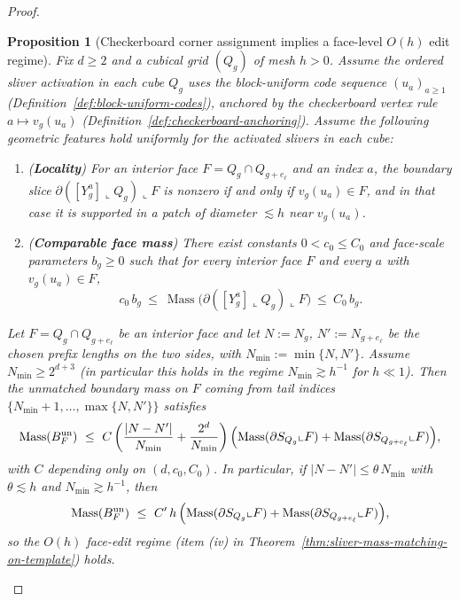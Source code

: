 \documentclass[11pt]{article}
\numberwithin{equation}{section}  %
\theoremstyle{plain}
\newtheorem{proposition}[theorem]{Proposition}
\theoremstyle{definition}
\theoremstyle{remark}
\DeclareMathOperator{\Mass}{Mass}
\begin{document}
\begin{proof}
\begin{proposition}[Checkerboard corner assignment implies a face-level $O(h)$ edit regime]\label{prop:checkerboard-face-oh-edit}\label{prop:template-edits}
Fix $d\ge 2$ and a cubical grid $(Q_g)$ of mesh $h>0$.
Assume the ordered sliver activation in each cube $Q_g$ uses the block-uniform code sequence $(u_a)_{a\ge 1}$
(Definition~\ref{def:block-uniform-codes}), anchored by the checkerboard vertex rule $a\mapsto v_g(u_a)$
(Definition~\ref{def:checkerboard-anchoring}).
Assume the following geometric features hold uniformly for the activated slivers in each cube:
\begin{enumerate}
\item[\textnormal{(G1)}] (\textbf{Locality}) For an interior face $F=Q_g\cap Q_{g+e_\ell}$ and an index $a$,
the boundary slice $\partial([Y_g^a]\llcorner Q_g)\llcorner F$ is nonzero if and only if $v_g(u_a)\in F$,
and in that case it is supported in a patch of diameter $\lesssim h$ near $v_g(u_a)$.
\item[\textnormal{(G2)}] (\textbf{Comparable face mass}) There exist constants $0<c_0\le C_0$ and face-scale parameters $b_g\ge 0$
such that for every interior face $F$ and every $a$ with $v_g(u_a)\in F$,
\[
c_0\,b_g\ \le\ \Mass\!\bigl(\partial([Y_g^a]\llcorner Q_g)\llcorner F\bigr)\ \le\ C_0\,b_g.
\]
\end{enumerate}
Let $F=Q_g\cap Q_{g+e_\ell}$ be an interior face and let $N:=N_g$, $N':=N_{g+e_\ell}$ be the chosen prefix lengths on the two sides,
with $N_{\min}:=\min\{N,N'\}$.
Assume $N_{\min}\ge 2^{d+3}$ (in particular this holds in the regime $N_{\min}\gtrsim h^{-1}$ for $h\ll 1$).
Then the unmatched boundary mass on $F$ coming from tail indices $\{N_{\min}+1,\dots,\max\{N,N'\}\}$ satisfies
\[
\Mass(B_F^{\mathrm{un}})\ \le\ C\left(\frac{|N-N'|}{N_{\min}}+\frac{2^d}{N_{\min}}\right)
\Bigl(\Mass(\partial S_{Q_g}\llcorner F)+\Mass(\partial S_{Q_{g+e_\ell}}\llcorner F)\Bigr),
\]
with $C$ depending only on $(d,c_0,C_0)$.
In particular, if $|N-N'|\le \theta\,N_{\min}$ with $\theta\lesssim h$ and $N_{\min}\gtrsim h^{-1}$, then
\[
\Mass(B_F^{\mathrm{un}})\ \le\ C'\,h\,
\Bigl(\Mass(\partial S_{Q_g}\llcorner F)+\Mass(\partial S_{Q_{g+e_\ell}}\llcorner F)\Bigr),
\]
so the $O(h)$ face-edit regime (item \textnormal{(iv)} in Theorem~\ref{thm:sliver-mass-matching-on-template}) holds.
\end{proposition}



\end{proof}
\end{document}
